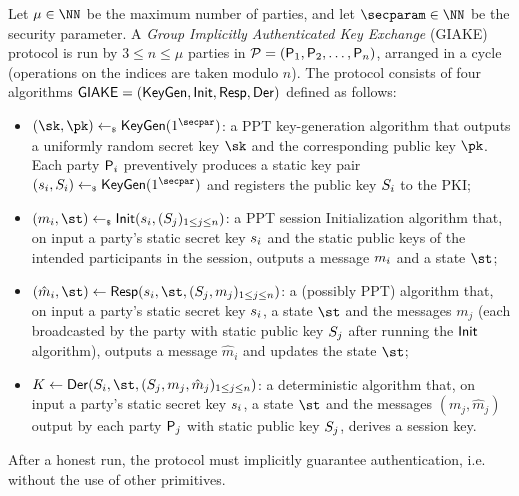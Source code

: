 \begin{plaindef}[GIAKE]\label{def:GKE}
	Let $\projectKey \in \NN$ be the maximum number of parties, and let $\secparam\in \NN$ be the security parameter. 
	A \textit{Group Implicitly Authenticated Key Exchange} (GIAKE) protocol is run by $3\leq n \leq \mu$ parties in $\PartySet = (\Party_1,\allowbreak \Party_2,\dots,\Party_n)$, arranged in a cycle (operations on the indices are taken modulo $n$).
	The protocol consists of four algorithms $\GIAKE = (\KeyGen, \GAKEIni, \GAKERes, \GAKEDer)$ defined as follows:
	\begin{itemize}
		\item $(\sk,\pk) \getsr \KeyGen(1^\secpar)$: a PPT key-generation algorithm that outputs a uniformly random secret key $\sk$ and the corresponding public key $\pk$.
		Each party $\User[i]$ preventively produces a static key pair $(\ssk_i,\spk_i) \getsr \KeyGen(1^\secpar)$ and registers the public key $\spk_i$ to the PKI;
		\item $(m_i,\st) \getsr \GAKEIni (\ssk_i,(\spk_j)_{1\leq j \leq n})$: a PPT session Initialization algorithm that, on input a party's static secret key $\ssk_i$ and the static public keys of the intended participants in the session, outputs a message $\messageIni$ and a state $\st$;
		\item $(\hat{m}_i,\st) \gets \GAKERes(\ssk_i,\st,(\spk_j,m_j)_{1\leq j \leq n})$: a (possibly PPT) algorithm that, on input a party's static secret key $\ssk_i$, a state $\st$ and the messages $m_j$ (each broadcasted by the party with static public key $\spk_j$ after running the $\GAKEIni$ algorithm), outputs a message $\hat{m}_i$ and updates the state $\st$;
		\item $K \gets \GAKEDer (\spk_i,\st,(\spk_j,m_j,\hat{m}_j)_{1\leq j \leq n})$: a deterministic algorithm that,  on input a party's static secret key $\ssk_i$, a state $\st$ and the messages $(m_j,\hat{m}_j)$ output by each party $\User[j]$ with static public key $\spk_j$, derives a session key.
	\end{itemize}
	After a honest run, the protocol must implicitly guarantee authentication, i.e. without the use of other primitives.
\end{plaindef}	

